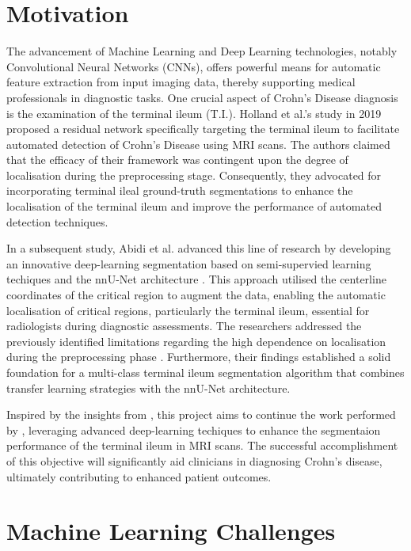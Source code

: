 \section{Motivation}

The advancement of Machine Learning and Deep Learning technologies, notably Convolutional Neural Networks (CNNs), offers powerful means for automatic feature extraction from input imaging data, thereby supporting medical professionals in diagnostic tasks. One crucial aspect of Crohn's Disease diagnosis is the examination of the terminal ileum (T.I.). Holland et al.'s study \cite{holland2019automatic} in 2019 proposed a residual network specifically targeting the terminal ileum to facilitate automated detection of Crohn's Disease using MRI scans. The authors claimed that the efficacy of their framework was contingent upon the degree of localisation during the preprocessing stage. Consequently, they advocated for incorporating terminal ileal ground-truth segmentations to enhance the localisation of the terminal ileum and improve the performance of automated detection techniques.

In a subsequent study, Abidi et al. \cite{Ali2022} advanced this line of research by developing an innovative deep-learning segmentation based on semi-supervied learning techiques and the nnU-Net architecture \cite{isensee2021nnu}. This approach utilised the centerline coordinates of the critical region to augment the data, enabling the automatic localisation of critical regions, particularly the terminal ileum, essential for radiologists during diagnostic assessments. The researchers addressed the previously identified limitations regarding the high dependence on localisation during the preprocessing phase \cite{holland2019automatic}. Furthermore, their findings established a solid foundation for a multi-class terminal ileum segmentation algorithm that combines transfer learning strategies with the nnU-Net architecture.

Inspired by the insights from \cite{holland2019automatic, Ali2022}, this project aims to continue the work performed by \cite{Ali2022}, leveraging advanced deep-learning techiques to enhance the segmentaion performance of the terminal ileum in MRI scans. The successful accomplishment of this objective will significantly aid clinicians in diagnosing Crohn's disease, ultimately contributing to enhanced patient outcomes.

\section{Machine Learning Challenges}

